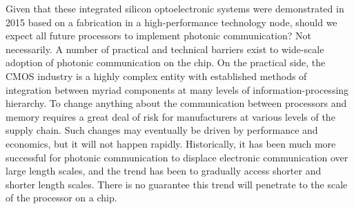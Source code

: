 Given that these integrated silicon optoelectronic systems were demonstrated in 2015 based on a fabrication in a high-performance technology node, should we expect all future processors to implement photonic communication? Not necessarily. A number of practical and technical barriers exist to wide-scale adoption of photonic communication on the chip. On the practical side, the CMOS industry is a highly complex entity with established methods of integration between myriad components at many levels of information-processing hierarchy. To change anything about the communication between processors and memory requires a great deal of risk for manufacturers at various levels of the supply chain. Such changes may eventually be driven by performance and economics, but it will not happen rapidly. Historically, it has been much more successful for photonic communication to displace electronic communication over large length scales, and the trend has been to gradually access shorter and shorter length scales. There is no guarantee this trend will penetrate to the scale of the processor on a chip. 

